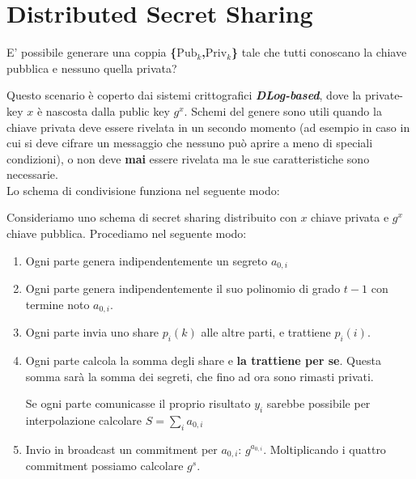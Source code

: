 \section{Distributed Secret Sharing}
\begin{problem}E' possibile generare una coppia \textbf{\{$\text{Pub}_k$,$\text{Priv}_k$\}} tale che tutti conoscano la chiave pubblica e nessuno quella privata?
\end{problem}
Questo scenario è coperto dai sistemi crittografici \textbf{\textit{DLog-based}}, dove la private-key $x$ è nascosta dalla public key $g^x$. Schemi del genere sono utili quando la chiave privata deve essere rivelata in un secondo momento (ad esempio in caso in cui si deve cifrare un messaggio che nessuno può aprire a meno di speciali condizioni), o non deve \textbf{mai} essere rivelata ma le sue caratteristiche sono necessarie.\\
Lo schema di condivisione funziona nel seguente modo:
\begin{definition}\label{def:dss}
Consideriamo uno schema di secret sharing distribuito con $x$ chiave privata e $g^x$ chiave pubblica. Procediamo nel seguente modo:
\begin{enumerate}
    \item Ogni parte genera indipendentemente un segreto $a_{0,i}$
    \item Ogni parte genera indipendentemente il suo polinomio di grado $t-1$ con termine noto $a_{0,i}$.
    \item Ogni parte invia uno share $p_i(k)$ alle altre parti, e trattiene $p_i(i)$.
    \item Ogni parte calcola la somma degli share e \textbf{la trattiene per se}. Questa somma sarà la somma dei segreti, che fino ad ora sono rimasti privati.\\
    \begin{remark}
    Se ogni parte comunicasse il proprio risultato $y_i$ sarebbe possibile per interpolazione calcolare $S=\sum_i a_{0,i}$
    \end{remark}
    \item Invio in broadcast un commitment per $a_{0,i}$: $g^{a_{0,i}}$. Moltiplicando i quattro commitment possiamo calcolare $g^s$.
\end{enumerate}
\end{definition}
